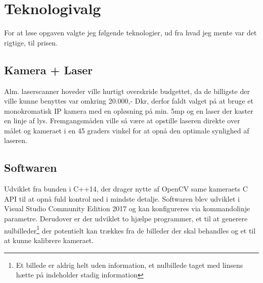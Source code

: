 \section{Teknologivalg}
For at løse opgaven valgte jeg følgende teknologier, ud fra hvad jeg mente var det rigtige, til prisen.

\subsection{Kamera + Laser}
Alm. laserscanner hoveder ville hurtigt overskride budgettet, da de billigste der ville kunne benyttes var omkring 20.000,- Dkr, derfor faldt valget på at bruge et monokromatisk IP kamera med en opløsning på min. 5mp og en laser der kaster en linje af lys. Fremgangsmåden ville så være at opstille laseren direkte over målet og kameraet i en 45 graders vinkel for at opnå den optimale synlighed af laseren.

\subsection{Softwaren}
Udviklet fra bunden i C++14, der drager nytte af OpenCV same kameraets C API til at opnå fuld kontrol ned i mindste detalje.
Softwaren blev udviklet i Visual Studio Community Edition 2017 og kan konfigureres via kommandolinje parametre. Derudover er der udviklet to hjælpe programmer, et til at generere nulbilleder\footnote{Et billede er aldrig helt uden information, et nulbillede taget med linsens hætte på indeholder stadig information} der potentielt kan trækkes fra de billeder der skal behandles og et til at kunne kalibrere kameraet.

